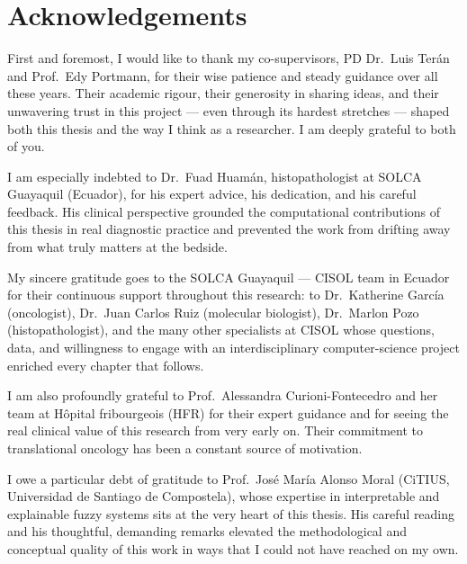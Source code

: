 
\chapter*{Acknowledgements}
\thispagestyle{empty}

First and foremost, I would like to thank my co-supervisors, PD Dr.\ Luis
Ter\'an and Prof.\ Edy Portmann, for their wise patience and steady
guidance over all these years. Their academic rigour, their generosity in
sharing ideas, and their unwavering trust in this project --- even
through its hardest stretches --- shaped both this thesis and the way I
think as a researcher. I am deeply grateful to both of you.

I am especially indebted to Dr.\ Fuad Huam\'an, histopathologist at SOLCA Guayaquil
(Ecuador), for his expert advice, his dedication, and his careful
feedback. His clinical perspective grounded the computational
contributions of this thesis in real diagnostic practice and prevented
the work from drifting away from what truly matters at the bedside.

My sincere gratitude goes to the SOLCA Guayaquil --- CISOL team in Ecuador for
their continuous support throughout this research: to Dr.\ Katherine
Garc\'ia (oncologist), Dr.\ Juan Carlos Ruiz (molecular biologist),
Dr.\ Marlon Pozo (histopathologist), and the many other specialists at
CISOL whose questions, data, and willingness to engage with an
interdisciplinary computer-science project enriched every chapter that
follows.

I am also profoundly grateful to Prof.\ Alessandra Curioni-Fontecedro and
her team at H\^opital fribourgeois (HFR) for their expert guidance and
for seeing the real clinical value of this research from very early on.
Their commitment to translational oncology has been a constant source
of motivation.

I owe a particular debt of gratitude to Prof.\ Jos\'e Mar\'ia Alonso
Moral (CiTIUS, Universidad de Santiago de Compostela), whose expertise
in interpretable and explainable fuzzy systems sits at the very heart of
this thesis. His careful reading and his thoughtful, demanding remarks
elevated the methodological and conceptual quality of this work in ways
that I could not have reached on my own.


